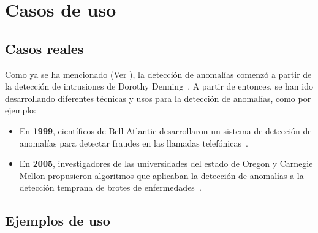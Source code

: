 \chapter{Casos de uso}\label{chap:cus}
\section{Casos reales}
Como ya se ha mencionado (Ver ), la detección de anomalías comenzó a partir de la
detección de intrusiones de Dorothy Denning~\cite{denning1987intrusion}. A partir de entonces, se
han ido desarrollando diferentes técnicas y usos para la detección de anomalías, como por ejemplo:

\begin{itemize}
	\item En \textbf{1999}, científicos de Bell Atlantic desarrollaron un sistema de detección de
		anomalías para detectar fraudes en las llamadas telefónicas~\cite{fawcett1999activity}.
	\item En \textbf{2005}, investigadores de las universidades del estado de Oregon y Carnegie Mellon
		propusieron algoritmos que aplicaban la detección de anomalías a la detección temprana de
		brotes de enfermedades~\cite{wong2005wsare}.
\end{itemize}

\section{Ejemplos de uso}
